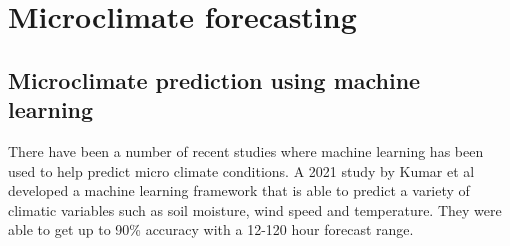 \section{Microclimate forecasting}

\subsection{Microclimate prediction using machine learning}

There have been a number of recent studies where machine learning has been used
to help predict micro climate conditions. A 2021 study by Kumar et al developed
a machine learning framework that is able to predict a variety of climatic
variables such as soil moisture, wind speed and temperature. They were able to
get up to 90\% accuracy with a 12-120 hour forecast range.


